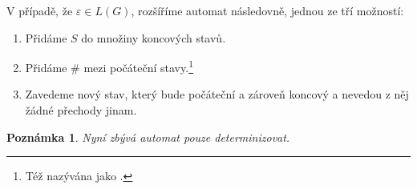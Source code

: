 \documentclass[10pt,a4paper]{article}
\theoremstyle{note}
\newtheorem{poznamka}{Poznámka}
\begin{document}
V případě, že $\varepsilon \in L(G)$, rozšíříme automat následovně, jednou ze tří možností:
\begin{enumerate}
\item
Přidáme $S$ do množiny koncových stavů.

\item
Přidáme $\#$ mezi počáteční stavy.\footnote{Též nazývána jako .}

\item
Zavedeme nový stav, který bude počáteční a zároveň koncový a nevedou z něj žádné přechody jinam.
\end{enumerate}

\begin{poznamka}
Nyní zbývá automat pouze determinizovat.
\end{poznamka}
\end{document}
